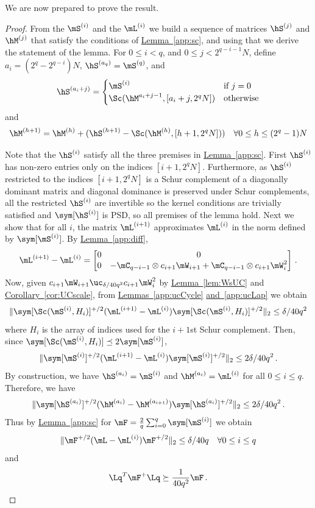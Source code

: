 \documentclass[11pt]{article}
\newcommand{\expref}[2]{\texorpdfstring{\hyperref[#2]{#1~\ref{#2}}}{#1~\ref{#2}}}
\begin{document}
We are now prepared to prove the result.
\AKMsmall*
\begin{proof}
From the %
%
$\mS^{(i)}$ and the $\mL^{(i)}$  %
we build a sequence of    
%
%
%
matrices $\hS^{(j)}$ and $\hM^{(j)}$ %
%
that satisfy the conditions of \expref{Lemma}{app:sc}, and using that we derive
the statement of the lemma. For $0\leq i < q$, and $0\leq j <2^{q-i-1}N$, define
$a_i= (2^q-2^{q-i})N$, $\hS^{(a_q)}=\mS^{(q)}$, 
and
\[ 
\hS^{(a_i+j)} = \begin{cases}
\mS^{(i)} & \text{if } j=0\\
\Sc(\hM^{a_i+j-1},[a_i+j,2^qN]) & \text{otherwise}\end{cases}\]
and
$$\hM^{(h+1)} = \hM^{(h)}+(\hS^{(h+1)}-\Sc(\hM^{(h)},[h+1,2^qN])) \quad \forall 0\leq h \leq (2^q-1)N$$

Note that the %
$\hS^{(i)}$  %
satisfy all the three premises in \expref{Lemma}{app:sc}. First $\hS^{(i)}$ has non-zero entries only on the indices $[i+ 1,2^q N]$. Furthermore, as $\hS^{(i)}$ restricted to the indices $[i+ 1,2^q N]$ is a Schur complement of a diagonally dominant matrix
%
%
and diagonal dominance is preserved under Schur complements, %
%
%
%
all the restricted %
$\hS^{(i)}$   %
are invertible so the kernel %
conditions  %
are trivially satisfied and $\sym[\hS^{(i)}]$ is PSD, so all premises of the lemma hold. 
Next we show that for all %
$i$,  %
the matrix %
%
$\mL^{(i+1)}$ approximates $\mL^{(i)}$ in the norm defined by $\sym[\mS^{(i)}]$.  By
\expref{Lemma}{app:diff},
$$\mL^{(i+1)}-\mL^{(i)} = \begin{bmatrix} 0 & 0\\ 0 & -\mC_{q-i-1}\otimes c_{i+1}\mW_{i+1}+\mC_{q-i-1}\otimes c_{i+1}\mW_{i}^2\end{bmatrix}\,.$$  %
Now, given $c_{i+1}\mW_{i+1} \uc_{\delta/40q^2}c_{i+1}\mW_{i}^2$ by \expref{Lemma}{lem:WsUC} and
\expref{Corollary}{cor:UCscale}, from
%
\expref{Lemmas}{app:ucCycle} \expref{and}{app:ucLap} %
%
we obtain
\[\|\sym[\Sc(\mS^{(i)},H_i)]^{+/2}(\mL^{(i+1)}-\mL^{(i)})\sym[{\Sc(\mS^{(i)},H_i)}]^{+/2}\|_2 \leq \delta/40q^2\]
where $H_i$
%
is the array of %
indices used for the $i+1$st Schur complement. %
Then,  %
since $\sym[\Sc(\mS^{(i)},H_i)] \preceq 2\sym[\mS^{(i)}]$,
\[\|\sym[{\mS^{(i)}}]^{+/2}(\mL^{(i+1)}-\mL^{(i)})\sym[{\mS^{(i)}}]^{+/2}\|_2 \leq 2\delta/40q^2\,.\]
%
By construction, we have $\hS^{(a_i)}=\mS^{(i)}$ and $\hM^{(a_i)}=\mL^{(i)}$ for all $0\leq i\leq q$. Therefore, we have
$$\|\sym[\hS^{(a_i)}]^{+/2}(\hM^{(a_{i})}-\hM^{(a_{i+1})})\sym[\hS^{(a_i)}]^{+/2}\|_2 \leq 2\delta/40q^2 \,.$$ %
Thus by \expref{Lemma}{app:sc} for $\mF=\frac{2}{q}\sum_{i=0}^q \sym[\mS^{(i)}]$ we obtain
\[\|\mF^{+/2}(\mL-\mL^{(i)})\mF^{+/2}\|_2\leq \delta/40q \quad \forall 0\leq i\leq q\]
and 
\[{\Lq}^T\mF^+\Lq \succeq \frac{1}{40q^2}\mF\,. \qedhere\] 
%
\end{proof}
\end{document}
